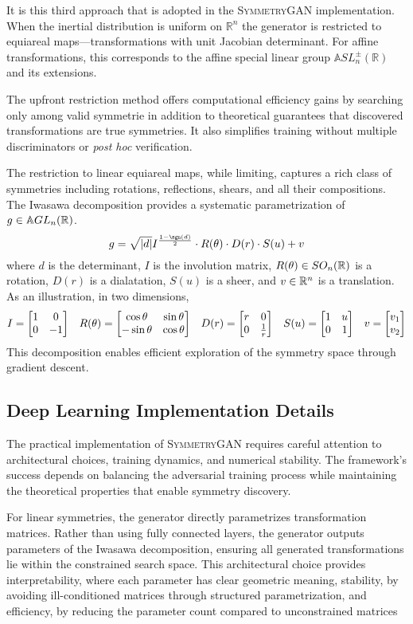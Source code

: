     It is this third approach that is adopted in the \textsc{SymmetryGAN} implementation.
    When the inertial distribution is uniform on \(\mathbb{R}^n\) the generator is restricted to equiareal maps---transformations with unit Jacobian determinant.
    For affine transformations, this corresponds to the affine special linear group \(\mathbb{A}SL^\pm_n(\mathbb{R})\) and its extensions.

    The upfront restriction method offers computational efficiency gains by searching only among valid symmetrie in addition to theoretical guarantees that discovered transformations are true symmetries.
    It also simplifies training without multiple discriminators or \textit{post hoc} verification.

    The restriction to linear equiareal maps, while limiting, captures a rich class of symmetries including rotations, reflections, shears, and all their compositions.
    The Iwasawa decomposition\kd{} provides a systematic parametrization of \(g\in\mathbb{A}GL_n(\mathbb{R})\).
    \[
        g = \sqrt{|d|} I^{\frac{1-\sgn(d)}{2}} \cdot R(\theta) \cdot D(r) \cdot S(u) + v
    \]
    where \(d\) is the determinant, \(I\) is the involution matrix, \(R(\theta)\in SO_n(\mathbb{R})\) is a rotation, \(D(r)\) is a dialatation, \(S(u)\) is a sheer, and \(v\in\mathbb{R}^n\) is a translation.
    As an illustration, in two dimensions,
    \[
        I = \mqty[1&0\\0&-1] \quad R(\theta) = \mqty[\cos\theta&\sin\theta\\-\sin\theta&\cos\theta] \quad D(r) = \mqty[r&0\\0&\frac1r] \quad S(u) = \mqty[1 & u\\0&1]\quad v = \mqty[v_1\\v_2]
    \]
    This decomposition enables efficient exploration of the symmetry space through gradient descent.

    \subsection{Deep Learning Implementation Details}
    The practical implementation of \textsc{SymmetryGAN} requires careful attention to architectural choices, training dynamics, and numerical stability.
    The framework's success depends on balancing the adversarial training process while maintaining the theoretical properties that enable symmetry discovery.
    
    For linear symmetries, the generator directly parametrizes transformation matrices.
    Rather than using fully connected layers, the generator outputs parameters of the Iwasawa decomposition, ensuring all generated transformations lie within the constrained search space.
    This architectural choice provides interpretability, where each parameter has clear geometric meaning, stability, by avoiding ill-conditioned matrices through structured parametrization, and efficiency, by reducing the parameter count compared to unconstrained matrices

